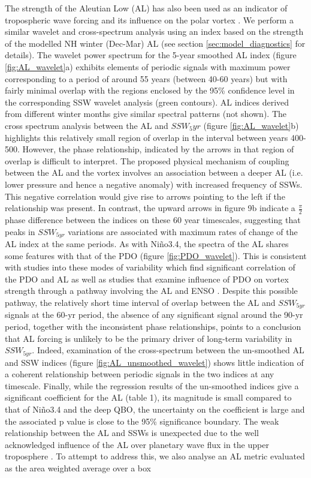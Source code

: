 The strength of the Aleutian Low (AL) has also been used as an indicator of tropospheric wave forcing and its influence on the polar vortex \citep{wooConnection2015b}. We perform a similar wavelet and cross-spectrum analysis using an index based on the strength of the modelled NH winter (Dec-Mar) AL (see section \ref{sec:model_diagnostics} for details). The wavelet power spectrum for the 5-year smoothed AL index (figure \ref{fig:AL_wavelet}a) exhibits elements of periodic signals with maximum power corresponding to a period of around 55 years (between 40-60 years) but with fairly minimal overlap with the regions enclosed by the 95\% confidence level in the corresponding SSW wavelet analysis (green contours). AL indices derived from different winter months give similar spectral patterns (not shown).  The cross spectrum analysis between the AL and $SSW_5yr$ (figure \ref{fig:AL_wavelet}b) highlights this relatively small region of overlap in the interval between years 400-500. However, the phase relationship, indicated by the arrows in that region of overlap is difficult to interpret. The proposed physical mechanism of coupling between the AL and the vortex \citep{wooConnection2015b} involves an association between a deeper AL (i.e. lower pressure and hence a negative anomaly) with increased frequency of SSWs. This negative correlation would give rise to arrows pointing to the left if the relationship was present. In contrast, the upward arrows in figure 9b indicate a $\frac{\pi}{2}$ phase difference between the indices on these 60 year timescales, suggesting that peaks in $SSW_{5yr}$ variations are associated with maximum rates of change of the AL index at the same periods. As with Ni\~{n}o3.4, the spectra of the AL shares some features with that of the PDO (figure \ref{fig:PDO_wavelet}). This is consistent with studies into these modes of variability which find significant correlation of the PDO and AL \citep{mantuaPacific1997a, rodionovSpatial2005b} as well as studies that examine influence of PDO on vortex strength through a pathway involving the AL and ENSO \citep{raoModulation2019d}. Despite this possible pathway, the relatively short time interval of overlap between the AL and $SSW_{5yr}$ signals at the 60-yr period, the absence of any significant signal around the 90-yr period, together with the inconsistent phase relationships, points to a conclusion that AL forcing is unlikely to be the primary driver of long-term variability in $SSW_{5yr}$. Indeed, examination of the cross-spectrum between the un-smoothed AL and SSW indices (figure \ref{fig:AL_unsmoothed_wavelet}) shows little indication of a coherent relationship between periodic signals in the two indices at any timescale. Finally, while the regression results of the un-smoothed indices give a significant coefficient for the AL (table 1), its magnitude is small compared to that of Ni\~{n}o3.4 and the deep QBO, the uncertainty on the coefficient is large and the associated p value is close to the 95\% significance boundary. The weak relationship between the AL and SSWs is unexpected due to the well acknowledged influence of the AL over planetary wave flux in the upper troposphere \citep{wooConnection2015b}. To attempt to address this, we also analyse an AL metric evaluated as the area weighted average over a box 